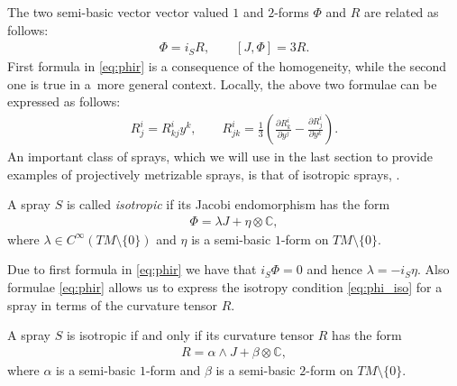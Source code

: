The two semi-basic vector vector valued $1$ and $2$-forms $\Phi$ and
$R$ are related as follows:
\begin{gather}
\Phi=i_SR, \qquad [J,\Phi]=3R. \label{eq:phir} \end{gather}
First formula in \eqref{eq:phir} is a consequence of the homogeneity,
while the second one is true in a~more general context. Locally, the
above two formulae can be expressed as follows:
\begin{gather*}
R^i_j=R^i_{kj}y^k, \qquad R^i_{jk}=\frac{1}{3}\left(\frac{\partial
    R^i_k}{\partial y^j}-\frac{\partial R^i_j}{\partial
    y^k}\right).%
    \end{gather*}
An important class of sprays, which we will use in the last section to
provide examples of projectively metrizable sprays, is that of
isotropic sprays, \cite[Def\/inition~3.29]{grifone00}.
\begin{Definition} A spray $S$ is called \emph{isotropic} if its Jacobi
  endomorphism has the form
\begin{gather}
\Phi=\lambda J + \eta \otimes \mathbb{C}, \label{eq:phi_iso}
\end{gather}
where $\lambda\in C^{\infty}(TM\setminus\{0\})$ and $\eta$ is a
semi-basic $1$-form on $TM\setminus\{0\}$.
\end{Definition}
Due to f\/irst formula in \eqref{eq:phir} we have that $i_S\Phi=0$ and
hence $\lambda=-i_S\eta$. Also formulae \eqref{eq:phir} allows us to express
the isotropy condition \eqref{eq:phi_iso} for a spray in terms of the curvature tensor
$R$.
\begin{Proposition} \label{prop:iso}
A spray $S$ is isotropic if and only if its curvature tensor $R$ has the form
\begin{gather}
R=\alpha\wedge J + \beta \otimes \mathbb{C}, \label{eq:r_iso}
\end{gather}
where $\alpha$ is a semi-basic $1$-form and $\beta$ is a semi-basic
$2$-form on $TM\setminus\{0\}$. \end{Proposition}

